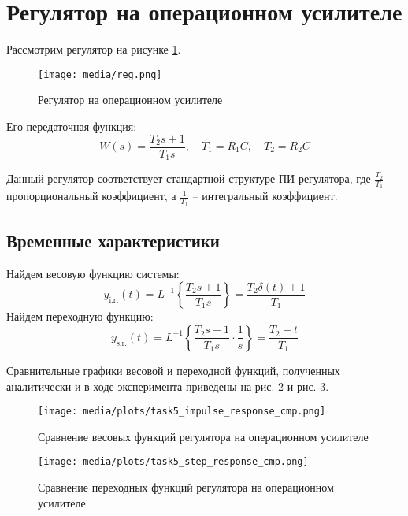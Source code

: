 \section{Регулятор на операционном усилителе}
Рассмотрим регулятор на рисунке \ref{fig:task5_reg}.
\begin{figure}[ht!]
    \centering
    \texttt{[image: media/reg.png]}
    \caption{Регулятор на операционном усилителе}
    \label{fig:task5_reg}
\end{figure}
Его передаточная функция:
\begin{equation}
    W(s) = \frac{T_2s + 1}{T_1s}, \quad T_1 = R_1C, \quad T_2 = R_2C
\end{equation}

Данный регулятор соответствует стандартной структуре ПИ-регулятора, где $\frac{T_2}{T_1}$ -- пропорциональный коэффициент, а $\frac{1}{T_1}$ -- интегральный коэффициент.

\subsection{Временные характеристики}
\noindent Найдем весовую функцию системы:
\begin{equation}
    y_{\text{i.r.}}(t) = L^{-1}\left\{\frac{T_2s + 1}{T_1s}\right\} = \frac{T_2\delta(t) + 1}{T_1}
\end{equation}
Найдем переходную функцию:
\begin{equation}
    y_{\text{s.r.}}(t) = L^{-1}\left\{\frac{T_2s + 1}{T_1s}\cdot\frac{1}{s}\right\} = \frac{T_2 + t}{T_1}
\end{equation}

Сравнительные графики весовой и переходной функций, полученных аналитически и в ходе эксперимента  приведены на рис. \ref{fig:task5_impulse_response_cmp} и рис. \ref{fig:task5_step_response_cmp}.
\begin{figure}[ht!]
    \centering
    \texttt{[image: media/plots/task5\_impulse\_response\_cmp.png]}
    \caption{Сравнение весовых функций регулятора на операционном усилителе}
    \label{fig:task5_impulse_response_cmp}
\end{figure}
\begin{figure}[ht!]
    \centering
    \texttt{[image: media/plots/task5\_step\_response\_cmp.png]}
    \caption{Сравнение переходных функций регулятора на операционном усилителе}
    \label{fig:task5_step_response_cmp}
\end{figure}

